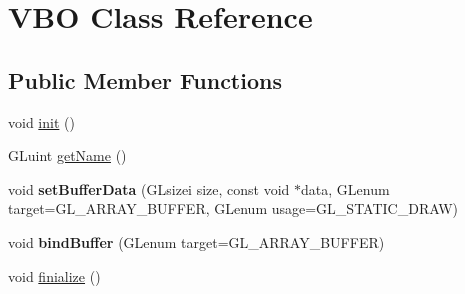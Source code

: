 \hypertarget{classVBO}{\section{V\-B\-O Class Reference}
\label{classVBO}
}
\subsection*{Public Member Functions}
\begin{DoxyCompactItemize}
\item 
void \hyperlink{classVBO_af1a4a8c60cac7e02e371db3d9fe496a4}{init} ()
\item 
G\-Luint \hyperlink{classVBO_affdb3a55d47548b939aad6a166af9310}{get\-Name} ()
\item 
\hypertarget{classVBO_a69960020a34122b6d4becdbf44ccdcd8}{void {\bfseries set\-Buffer\-Data} (G\-Lsizei size, const void $\ast$data, G\-Lenum target=G\-L\-\_\-\-A\-R\-R\-A\-Y\-\_\-\-B\-U\-F\-F\-E\-R, G\-Lenum usage=G\-L\-\_\-\-S\-T\-A\-T\-I\-C\-\_\-\-D\-R\-A\-W)}\label{classVBO_a69960020a34122b6d4becdbf44ccdcd8}

\item 
\hypertarget{classVBO_a3928672efb7ee07b0c5662e4dd7b421a}{void {\bfseries bind\-Buffer} (G\-Lenum target=G\-L\-\_\-\-A\-R\-R\-A\-Y\-\_\-\-B\-U\-F\-F\-E\-R)}\label{classVBO_a3928672efb7ee07b0c5662e4dd7b421a}

\item 
void \hyperlink{classVBO_a82cfb6c197f276eca01c409f064bf26c}{finialize} ()
\end{DoxyCompactItemize}


